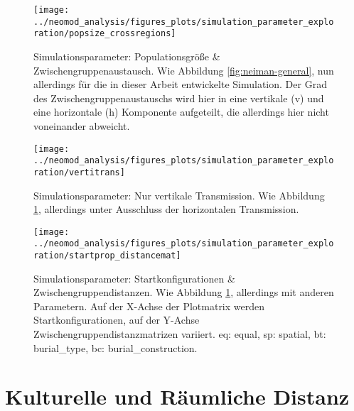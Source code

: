 \documentclass[openany,twoside,twocolumn]{book}
\begin{document}
\begin{figure}[!t]

{\centering \texttt{[image: ../neomod\_analysis/figures\_plots/simulation\_parameter\_exploration/popsize\_crossregions]} 

}

\caption[Simulationsparameter: Populationsgröße \& Zwischengruppenaustausch]{Simulationsparameter: Populationsgröße \& Zwischengruppenaustausch. Wie Abbildung \ref{fig:neiman-general}, nun allerdings für die in dieser Arbeit entwickelte Simulation. Der Grad des Zwischengruppenaustauschs wird hier in eine vertikale (v) und eine horizontale (h) Komponente aufgeteilt, die allerdings hier nicht voneinander abweicht.}\label{fig:sim-popsize-crossregions}
\end{figure}

\begin{figure}[!t]

{\centering \texttt{[image: ../neomod\_analysis/figures\_plots/simulation\_parameter\_exploration/vertitrans]} 

}

\caption[Simulationsparameter: Nur vertikale Transmission]{Simulationsparameter: Nur vertikale Transmission. Wie Abbildung \ref{fig:sim-popsize-crossregions}, allerdings unter Ausschluss der horizontalen Transmission.}\label{fig:sim-vertitrans}
\end{figure}

\begin{figure}[!t]

{\centering \texttt{[image: ../neomod\_analysis/figures\_plots/simulation\_parameter\_exploration/startprop\_distancemat]} 

}

\caption[Simulationsparameter: Startkonfigurationen \& Zwischengruppendistanzen]{Simulationsparameter: Startkonfigurationen \& Zwischengruppendistanzen. Wie Abbildung \ref{fig:sim-popsize-crossregions}, allerdings mit anderen Parametern. Auf der X-Achse der Plotmatrix werden Startkonfigurationen, auf der Y-Achse Zwischengruppendistanzmatrizen variiert. eq: equal, sp: spatial, bt: burial\_type, bc: burial\_construction.}\label{fig:sim-startprop-distancemat}
\end{figure}

\hypertarget{cultural-and-spatial-distance}{%
\section{Kulturelle und Räumliche
Distanz}\label{cultural-and-spatial-distance}}
\end{document}
